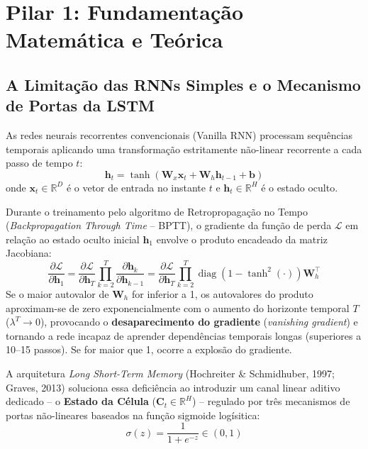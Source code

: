 \documentclass[11pt,a4paper]{article}
\begin{document}
\vspace{0.2cm}
\tableofcontents
\vspace{0.4cm}
\newpage

\section{Pilar 1: Fundamentação Matemática e Teórica}

\subsection{A Limitação das RNNs Simples e o Mecanismo de Portas da LSTM}
As redes neurais recorrentes convencionais (Vanilla RNN) processam sequências temporais aplicando uma transformação estritamente não-linear recorrente a cada passo de tempo $t$:
\begin{equation}
  \mathbf{h}_t = \tanh\left( \mathbf{W}_x \mathbf{x}_t + \mathbf{W}_h \mathbf{h}_{t-1} + \mathbf{b} \right)
\end{equation}
onde $\mathbf{x}_t \in \mathbb{R}^D$ é o vetor de entrada no instante $t$ e $\mathbf{h}_t \in \mathbb{R}^H$ é o estado oculto.

Durante o treinamento pelo algoritmo de Retropropagação no Tempo (\textit{Backpropagation Through Time} -- BPTT), o gradiente da função de perda $\mathcal{L}$ em relação ao estado oculto inicial $\mathbf{h}_1$ envolve o produto encadeado da matriz Jacobiana:
\begin{equation}
  \frac{\partial \mathcal{L}}{\partial \mathbf{h}_1} = \frac{\partial \mathcal{L}}{\partial \mathbf{h}_T} \prod_{k=2}^T \frac{\partial \mathbf{h}_k}{\partial \mathbf{h}_{k-1}} = \frac{\partial \mathcal{L}}{\partial \mathbf{h}_T} \prod_{k=2}^T \operatorname{diag}\left(1 - \tanh^2(\cdot)\right) \mathbf{W}_h^\top
\end{equation}
Se o maior autovalor de $\mathbf{W}_h$ for inferior a 1, os autovalores do produto aproximam-se de zero exponencialmente com o aumento do horizonte temporal $T$ ($\lambda^T \to 0$), provocando o \textbf{desaparecimento do gradiente} (\textit{vanishing gradient}) e tornando a rede incapaz de aprender dependências temporais longas (superiores a 10--15 passos). Se for maior que 1, ocorre a explosão do gradiente.

A arquitetura \textit{Long Short-Term Memory} (Hochreiter \& Schmidhuber, 1997; Graves, 2013) soluciona essa deficiência ao introduzir um canal linear aditivo dedicado -- o \textbf{Estado da Célula} ($\mathbf{C}_t \in \mathbb{R}^H$) -- regulado por três mecanismos de portas não-lineares baseados na função sigmoide logísitica:
\begin{equation}
  \sigma(z) = \frac{1}{1 + e^{-z}} \in (0, 1)
\end{equation}
\end{document}
